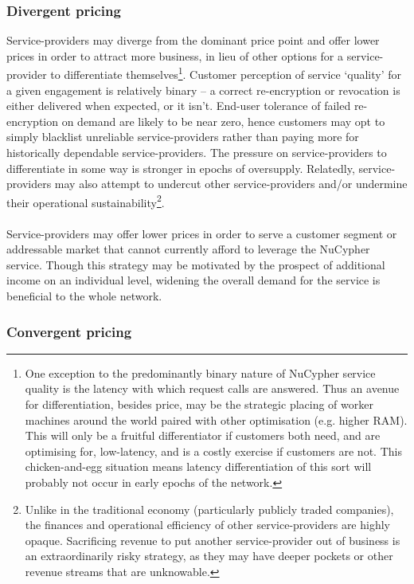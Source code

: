 \documentclass[longbibliography,nofootinbib]{revtex4-1}
\begin{document}
\subsubsection{Divergent pricing}

Service-providers may diverge from the dominant price point and offer lower prices in order to attract more business, in lieu of other options for a service-provider to differentiate themselves\footnote{One exception to the predominantly binary nature of NuCypher service quality is the latency with which request calls are answered. Thus an avenue for differentiation, besides price, may be the strategic placing of worker machines around the world paired with other optimisation (e.g. higher RAM). This will only be a fruitful differentiator if customers both need, and are optimising for, low-latency, and is a costly exercise if customers are not. This chicken-and-egg situation means latency differentiation of this sort will probably not occur in early epochs of the network.}. Customer perception of service ‘quality’ for a given engagement is relatively binary – a correct re-encryption or revocation is either delivered when expected, or it isn't. End-user tolerance of failed re-encryption on demand are likely to be near zero, hence customers may opt to simply blacklist unreliable service-providers rather than paying more for historically dependable service-providers. The pressure on service-providers to differentiate in some way is stronger in epochs of oversupply. Relatedly, service-providers may also attempt to undercut other service-providers and/or undermine their operational sustainability\footnote{Unlike in the traditional economy (particularly publicly traded companies), the finances and operational efficiency of other service-providers are highly opaque. Sacrificing revenue to put another service-provider out of business is an extraordinarily risky strategy, as they may have deeper pockets or other revenue streams that are unknowable.}.
\\\\
Service-providers may offer lower prices in order to serve a customer segment or addressable market that cannot currently afford to leverage the NuCypher service. Though this strategy may be motivated by the prospect of additional income on an individual level, widening the overall demand for the service is beneficial to the whole network. 

\subsubsection{Convergent pricing}
\end{document}
